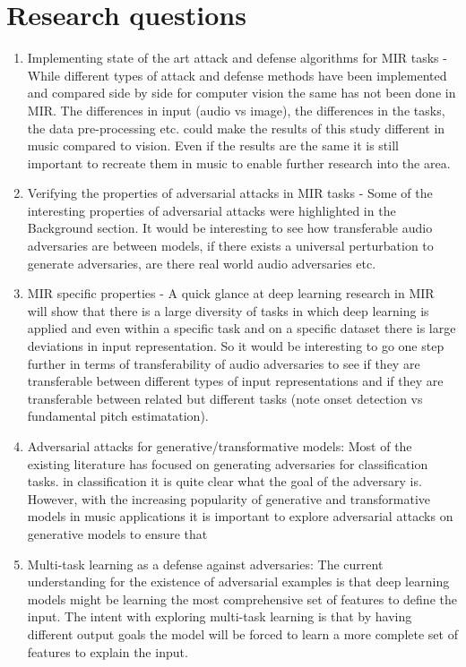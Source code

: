 \documentclass[journal,onecolumn]{IEEEtran}
\begin{document}
\section{Research questions}
\begin{enumerate}
\item Implementing state of the art attack and defense algorithms for MIR tasks -
While different types of attack and defense methods have been implemented and compared side by side for computer vision the same has not been done in MIR. The differences in input (audio vs image), the differences in the tasks, the data pre-processing etc. could make the results of this study different in music compared to vision. Even if the results are the same it is still important to recreate them in music to enable further research into the area.

\item Verifying the properties of adversarial attacks in MIR tasks - 
Some of the interesting properties of adversarial attacks were highlighted in the Background section. It would be interesting to see how transferable audio adversaries are between models, if there exists a universal perturbation to generate adversaries, are there real world audio adversaries etc.

\item MIR specific properties - A quick glance at deep learning research in MIR will show that there is a large diversity of tasks in which deep learning is applied and even within a specific task and on a specific dataset there is large deviations in input representation. So it would be interesting to go one step further in terms of transferability of audio adversaries to see if they are transferable between different types of input representations and if they are transferable between related but different tasks (note onset detection vs fundamental pitch estimatation).
 
\item Adversarial attacks for generative/transformative models: Most of the existing literature has focused on generating adversaries for classification tasks. in classification it is quite clear what the goal of the adversary is. However, with the increasing popularity of generative and transformative models in music applications it is important to explore adversarial attacks on generative models to ensure that 

\item Multi-task learning as a defense against adversaries: The current understanding for the existence of adversarial examples is that deep learning models might be learning the most comprehensive set of features to define the input. The intent with exploring multi-task learning is that by having different output goals the model will be forced to learn a more complete set of features to explain the input.
\end{enumerate}
\end{document}
